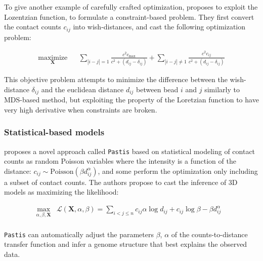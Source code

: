 \documentclass[letterpaper,12pt]{article}
\newcommand{\Xb}{\textbf{X}}
\begin{document}
To give another example of carefully crafted optimization, \cite{trieu:3D}
proposes to exploit the Lozentzian function, to formulate a constraint-based
problem. They first convert the contact counts $c_{ij}$ into wish-distances,
and cast the following optimization problem:

\begin{equation*}
\renewcommand{\arraystretch}{2}
\begin{array}{ccl}
\underset{\Xb}{\text{maximize}} & & \underset{| i - j | = 1}{\sum} \frac{c^2
c_\text{max}}{c^2 + (d_{ij} - \delta_{ij})} + 
\underset{| i - j | \neq 1}{\sum} \frac{c^2 c_{ij}}{c^2 + (d_{ij} - \delta_{ij})}
\end{array}
\end{equation*}

This objective problem attempts to minimize the difference between the
wish-distance $\delta_{ij}$ and the euclidean distance $d_{ij}$ between bead
$i$ and $j$ similarly to MDS-based method, but exploiting the property of the
Loretzian function to have very high derivative when constraints are broken.


\subsubsection*{Statistical-based models}

\citet{varoquaux:statistical} proposes a novel approach called \texttt{Pastis}
based on statistical modeling of contact counts as random Poisson variables
where the intensity is a function of the distance: $c_{ij} \sim
\text{Poisson}(\beta d_{ij}^\alpha)$, and some perform the optimization only
including a subset of contact counts. The authors propose to cast the
inference of 3D models as maximizing the likelihood:

\begin{equation}
\renewcommand{\arraystretch}{2}
\begin{array}{cll}
\underset{\alpha, \beta, \textbf{X}}{\text{max}} &
\mathcal{L}(\mathbf{X}, \alpha, \beta) = \underset{i<j\leq n}{\sum}  c_{ij}
\alpha \log d_{ij} + c_{ij} \log \beta - \beta d_{ij}^\alpha &\\
\end{array}
\end{equation}


\texttt{Pastis} can automatically adjust the parameters $\beta$, $\alpha$ of
the counts-to-distance transfer function and infer a genome structure that
best explains the observed data.
\end{document}
